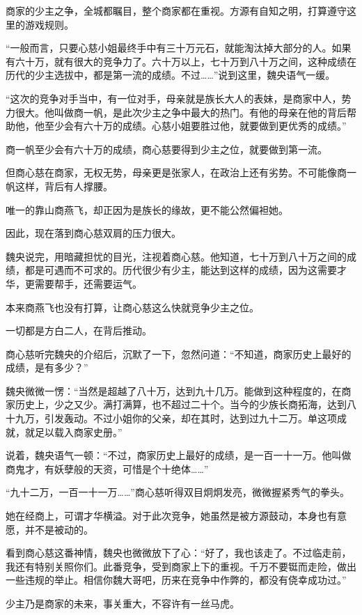 \begin{this_body}
商家的少主之争，全城都瞩目，整个商家都在重视。方源有自知之明，打算遵守这里的游戏规则。

“一般而言，只要心慈小姐最终手中有三十万元石，就能淘汰掉大部分的人。如果有六十万，就有很大的竞争力了。六十万以上，七十万到八十万之间，这种成绩在历代的少主选拔中，都是第一流的成绩。不过……”说到这里，魏央语气一缓。

“这次的竞争对手当中，有一位对手，母亲就是族长大人的表妹，是商家中人，势力很大。他叫做商一帆，是此次少主之争中最大的热门。有他的母亲在他的背后帮助他，他至少会有六十万的成绩。心慈小姐要胜过他，就要做到更优秀的成绩。”

商一帆至少会有六十万的成绩，商心慈要得到少主之位，就要做到第一流。

但商心慈在商家，无权无势，母亲更是张家人，在政治上还有劣势。不可能像商一帆这样，背后有人撑腰。

唯一的靠山商燕飞，却正因为是族长的缘故，更不能公然偏袒她。

因此，现在落到商心慈双肩的压力很大。

魏央说完，用暗藏担忧的目光，注视着商心慈。他知道，七十万到八十万之间的成绩，都是可遇而不可求的。历代很少有少主，能达到这样的成绩，因为这需要才华，更需要帮手，还需要运气。

本来商燕飞也没有打算，让商心慈这么快就竞争少主之位。

一切都是方白二人，在背后推动。

商心慈听完魏央的介绍后，沉默了一下，忽然问道：“不知道，商家历史上最好的成绩，是有多少？”

魏央微微一愣：“当然是超越了八十万，达到九十几万。能做到这种程度的，在商家历史上，少之又少。满打满算，也不超过二十个。当今的少族长商拓海，达到八十九万，引发轰动。不过小姐你的父亲，却在其时，达到过九十二万。单这项成就，就足以载入商家史册。”

说着，魏央语气一顿：“不过，商家历史上最好的成绩，是一百一十一万。他叫做商鬼才，有妖孽般的天资，可惜是个十绝体……”

“九十二万，一百一十一万……”商心慈听得双目炯炯发亮，微微握紧秀气的拳头。

她在经商上，可谓才华横溢。对于此次竞争，她虽然是被方源鼓动，本身也有意愿，并不是被动的。

看到商心慈这番神情，魏央也微微放下了心：“好了，我也该走了。不过临走前，我还有特别关照你们。此番竞争，受到商家上下的重视。千万不要铤而走险，做出一些违规的举止。相信你魏大哥吧，历来在竞争中作弊的，都没有侥幸成功过。”

少主乃是商家的未来，事关重大，不容许有一丝马虎。


\end{this_body}
